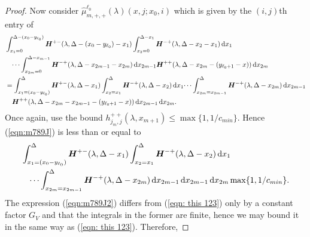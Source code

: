 \begin{proof}
        Now consider \(\widehat\mu_{m,+,+}^{\ell_0}(\lambda)( x,j;x_0,i) \) which is given by the \((i,j)\)th entry of 
        \begin{align}
		\nonumber& \int_{x_1 = 0}^{\Delta-(x_0-y_{\ell_0})} \boldsymbol H^{+-}(\lambda,\Delta-(x_0-y_{\ell_0})-x_1) \int_{x_2 = 0}^{\Delta-x_1} \boldsymbol H^{-+}(\lambda,\Delta - x_2-x_1) \, \mathrm{d} x_1 
		\\\nonumber &\quad\dots  
		\int_{x_{2m}=0}^{\Delta-x_{m-1}} \boldsymbol H^{-+}(\lambda,\Delta -x_{2m-1} - x_{2m}) \, \mathrm{d} x_{2m-1}
		 \boldsymbol H^{++}(\lambda,\Delta -x_{2m}- (y_{\ell_0+1}- x))\, \mathrm{d} x_{2m}
		\\\nonumber&= \int_{x_1 = (x_0-y_{\ell_0})}^{\Delta} \boldsymbol H^{+-}(\lambda,\Delta-x_1) \int_{x_2 = x_1}^{\Delta} \boldsymbol H^{-+}(\lambda,\Delta -x_2) \, \mathrm{d} x_1 
		\dots  
		\int_{x_{2m}=x_{2m-1}}^{\Delta} \boldsymbol H^{-+}(\lambda,\Delta - x_{2m}) \, \mathrm{d} x_{2m-1}
		\\&\quad\boldsymbol H^{++}(\lambda,\Delta -x_{2m}-x_{2m-1}- (y_{\ell_0+1}- x))\, \mathrm{d} x_{2m-1}\, \mathrm{d} x_{2m}.\label{eqn:m789J}
        \end{align}
        Once again, use the bound \(h^{++}_{j_m,j}(\lambda,x_{m+1})\leq \max\{1, 1/c_{min}\}\). Hence (\ref{eqn:m789J}) is less than or equal to 
        \begin{align}
        		&\int_{x_1 = (x_0-y_{\ell_0})}^{\Delta} \boldsymbol H^{+-}(\lambda,\Delta-x_1) \int_{x_2 = x_1}^{\Delta} \boldsymbol H^{-+}(\lambda,\Delta -x_2) \, \mathrm{d} x_1 \nonumber
		\\&\quad\dots  
		\int_{x_{2m}=x_{2m-1}}^{\Delta} \boldsymbol H^{-+}(\lambda,\Delta - x_{2m}) \, \mathrm{d} x_{2m-1}
		\, \mathrm{d} x_{2m-1}\, \mathrm{d} x_{2m}\max\{1, 1/c_{min}\}.\label{eqn:m789J2}
        \end{align}
        The expression (\ref{eqn:m789J2}) differs from (\ref{eqn: this 123}) only by a constant factor \(G_V\) and that the integrals in the former are finite, hence we may bound it in the same way as (\ref{eqn: this 123}). Therefore, 

\end{proof}

